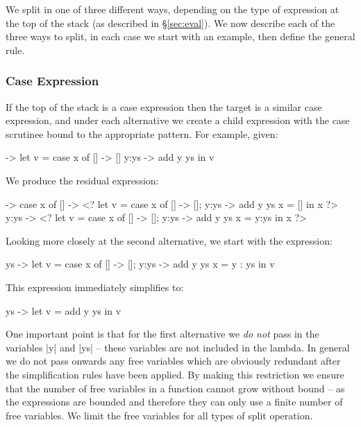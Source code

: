 \documentclass[draft]{sigplanconf}
\begin{document}
\smallskip
We split in one of three different ways, depending on the type of expression at the top of the stack (as described in \S\ref{sec:eval}). We now describe each of the three ways to split, in each case we start with an example, then define the general rule.

\subsubsection{Case Expression}

If the top of the stack is a case expression then the target is a similar case expression, and under each alternative we create a child expression with the case scrutinee bound to the appropriate pattern. For example, given:

\begin{code}
\x ->  let   v = case  x of
                       []    -> []
                       y:ys  -> add y ys
       in    v
\end{code}

We produce the residual expression:

\begin{code}
\x ->  case x of
       []    -> <?  let  v =  case x of [] -> []; y:ys -> add y ys
                         x =  []
                    in   x ?>
       y:ys  -> <?  let  v =  case x of [] -> []; y:ys -> add y ys
                         x =  y:ys
                    in   x ?>
\end{code}

Looking more closely at the second alternative, we start with the expression:

\begin{code}
\y ys ->  let  v  = case x of [] -> []; y:ys -> add y ys
               x  = y : ys
          in   v
\end{code}

This expression immediately simplifies to:

\begin{code}
\y ys ->  let  v = add y ys
          in   v
\end{code}

One important point is that for the first alternative we \textit{do not} pass in the variables |y| and |ys| -- these variables are not included in the lambda. In general we do not pass onwards any free variables which are obviously redundant after the simplification rules have been applied. By making this restriction we ensure that the number of free variables in a function cannot grow without bound -- as the expressions are bounded and therefore they can only use a finite number of free variables. We limit the free variables for all types of split operation.
\end{document}
